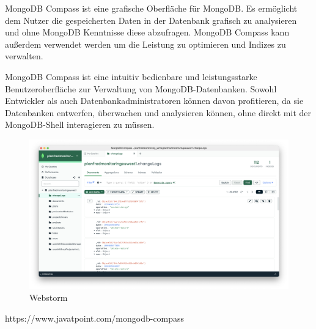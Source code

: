 MongoDB Compass ist eine grafische Oberfläche für MongoDB. Es ermöglicht dem Nutzer die gespeicherten Daten in der Datenbank grafisch zu analysieren und ohne MongoDB Kenntnisse diese abzufragen. MongoDB Compass kann außerdem verwendet werden um die Leistung zu optimieren und Indizes zu verwalten.\newline

MongoDB Compass ist eine intuitiv bedienbare und leistungsstarke Benutzeroberfläche zur Verwaltung von MongoDB-Datenbanken. Sowohl Entwickler als auch Datenbankadministratoren können davon profitieren, da sie Datenbanken entwerfen, überwachen und analysieren können, ohne direkt mit der MongoDB-Shell interagieren zu müssen.

\begin{figure}[h!]
    \centering
    \includegraphics[width=1\linewidth]{pics/mongodb-compass.png}
    \caption{Webstorm}
    \label{fig:enter-label}
\end{figure}



https://www.javatpoint.com/mongodb-compass

